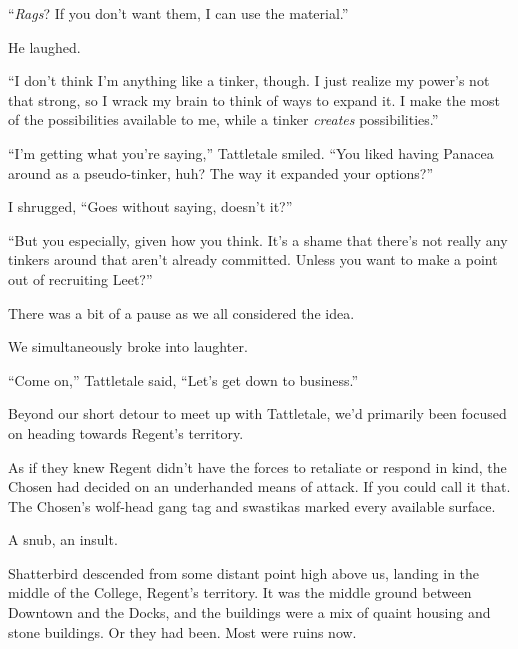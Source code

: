 ``\emph{Rags}?  If you don't want them, I can use the material.''



He laughed.



``I don't think I'm anything like a tinker, though.  I just realize my power's not that strong, so I wrack my brain to think of ways to expand it.  I make the most of the possibilities available to me, while a tinker \emph{creates} possibilities.''



``I'm getting what you're saying,'' Tattletale smiled.  ``You liked having Panacea around as a pseudo-tinker, huh?  The way it expanded your options?''



I shrugged, ``Goes without saying, doesn't it?''



``But you especially, given how you think.  It's a shame that there's not really any tinkers around that aren't already committed.  Unless you want to make a point out of recruiting Leet?''



There was a bit of a pause as we all considered the idea.



We simultaneously broke into laughter.



``Come on,'' Tattletale said, ``Let's get down to business.''



Beyond our short detour to meet up with Tattletale, we'd primarily been focused on heading towards Regent's territory.



As if they knew Regent didn't have the forces to retaliate or respond in kind, the Chosen had decided on an underhanded means of attack.  If you could call it that.  The Chosen's wolf-head gang tag and swastikas marked every available surface.



A snub, an insult.



Shatterbird descended from some distant point high above us, landing in the middle of the College, Regent's territory.  It was the middle ground between Downtown and the Docks, and the buildings were a mix of quaint housing and stone buildings.  Or they had been.  Most were ruins now.



